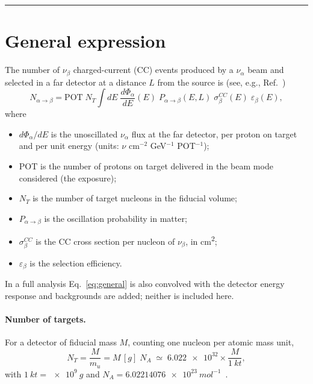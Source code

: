 \documentclass[11pt,a4paper]{article}
\newcommand{\POT}{\mathrm{POT}}
\begin{document}
\vspace{1ex}\hrule\vspace{2ex}

\section{General expression}

The number of $\nu_\beta$ charged-current (CC) events produced by a $\nu_\alpha$ beam and selected in a far
detector at a distance $L$ from the source is (see, e.g., Ref.~\cite{Huber:2004ka})
\begin{equation}
  N_{\alpha\to\beta} = \POT \; N_T \int dE \;
  \frac{d\Phi_\alpha}{dE}(E)\; P_{\alpha\to\beta}(E, L)\; \sigma^{CC}_\beta(E)\; \varepsilon_\beta(E),
  \label{eq:general}
\end{equation}
where
\begin{itemize}
  \item $d\Phi_\alpha/dE$ is the unoscillated $\nu_\alpha$ flux at the far detector, per proton on
        target and per unit energy (units: $\nu$ cm$^{-2}$ GeV$^{-1}$ POT$^{-1}$);
  \item $\POT$ is the number of protons on target delivered in the beam mode considered (the exposure);
  \item $N_T$ is the number of target nucleons in the fiducial volume;
  \item $P_{\alpha\to\beta}$ is the oscillation probability in matter;
  \item $\sigma^{CC}_\beta$ is the CC cross section per nucleon of $\nu_\beta$, in \si{cm^2};
  \item $\varepsilon_\beta$ is the selection efficiency.
\end{itemize}
In a full analysis Eq.~\eqref{eq:general} is also convolved with the detector energy response and
backgrounds are added; neither is included here.

\paragraph{Number of targets.}
For a detector of fiducial mass $M$, counting one nucleon per atomic mass unit,
\begin{equation}
  N_T = \frac{M}{m_u} = M\,[\si{g}]\; N_A
  \;\simeq\; \num{6.022e32}\times\frac{M}{\SI{1}{kt}} ,
\end{equation}
with $\SI{1}{kt} = \SI{e9}{g}$ and $N_A = \SI{6.02214076e23}{mol^{-1}}$~\cite{CODATA2018}.
\end{document}
